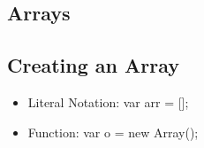 \documentclass {article}
\begin{document}
	\subsection{Arrays}
		\subsection {Creating an Array}
			\begin{itemize}
				\item Literal Notation: var arr = [];
				\item Function: var o = new Array();
			\end{itemize}
	
			
\end{document}
